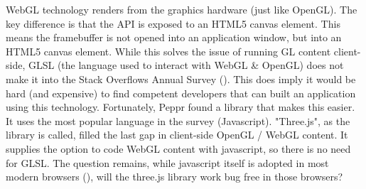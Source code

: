 WebGL technology renders from the graphics hardware (just like OpenGL). The key difference is that the API is exposed to an HTML5 canvas element. This means the framebuffer is not opened into an application window, but into an HTML5 canvas element. While this solves the issue of running GL content client-side, GLSL (the language used to interact with WebGL \& OpenGL) does not make it into the Stack Overflows Annual Survey (\cite{stackoverflowDeveloperSurvey}). This does imply it would be hard (and expensive) to find competent developers that can built an application using this technology.
Fortunately, Peppr found a library that makes this easier. It uses the most popular language in the survey (Javascript). "Three.js", as the library is called, filled the last gap in client-side OpenGL / WebGL content. It supplies the option to code WebGL content with javascript, so there is no need for GLSL. The question remains, while javascript itself is adopted in most modern browsers (\cite{javascriptSupport}), will the three.js library work bug free in those browsers?


\newpage





